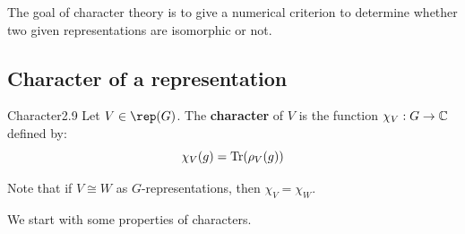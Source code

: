 \documentclass[twoside = false,	%
		headsepline,		%
		parskip = true,
		]{scrbook}						%
\begin{document}
    The goal of character theory is to give a numerical criterion to determine whether two given representations are isomorphic or not.
    
    \subsection{Character of a representation}
        \begin{definition}{Character}{2.9}
            Let $V\in\rep(G)$. The \textbf{character} of $V$ is the function $\chi_V : G\to \mathbb C$ defined by:
            \begin{equation*}
                \chi_V(g)=\mathrm{Tr}(\rho_V(g))
            \end{equation*}
        \end{definition}
        Note that if $V\cong W$ as $G$-representations, then $\chi_V = \chi_W$.
        
        We start with some properties of characters.
        
\end{document}
